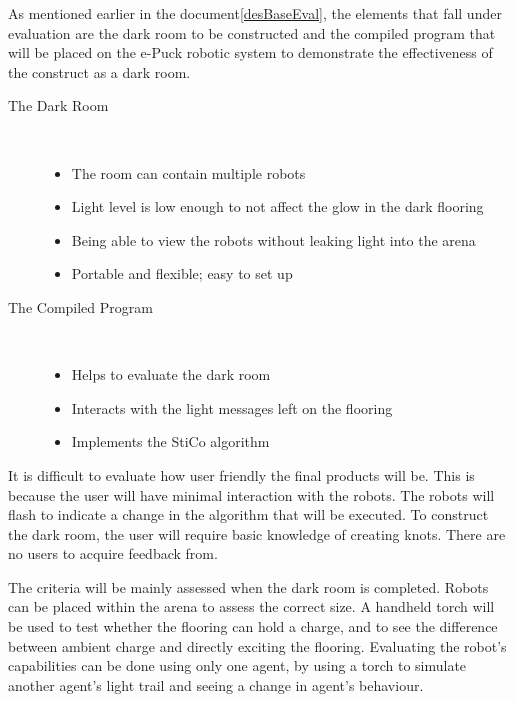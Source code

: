 As mentioned earlier in the document\ref{desBaseEval}, the elements that fall
under evaluation are the dark room to be constructed and the compiled program
that will be placed on the e-Puck robotic system to demonstrate the 
effectiveness of the construct as a dark room.

\begin{description}
  \item[The Dark Room] \hfill \\
  \begin{itemize}
    \item The room can contain multiple robots
    \item Light level is low enough to not affect the glow in the dark flooring
    \item Being able to view the robots without leaking light into the arena
    \item Portable and flexible; easy to set up
  \end{itemize}
  \item[The Compiled Program] \hfill \\
  \begin{itemize}
    \item Helps to evaluate the dark room
    \item Interacts with the light messages left on the flooring
    \item Implements the StiCo algorithm
  \end{itemize}
\end{description}

It is difficult to evaluate how user friendly the final products will be.  This
is because the user will have minimal interaction with the robots.  The robots
will flash to indicate a change in the algorithm that will be executed.  To
construct the dark room, the user will require basic knowledge of creating
knots.  There are no users to acquire feedback from.

The criteria will be mainly assessed when the dark room is completed.  Robots
can be placed within the arena to assess the correct size.  A handheld torch
will be used to test whether the flooring can hold a charge, and to see the
difference between ambient charge and directly exciting the flooring.
Evaluating the robot's capabilities can be done using only one agent, by using
a torch to simulate another agent's light trail and seeing a change in
agent's behaviour.

